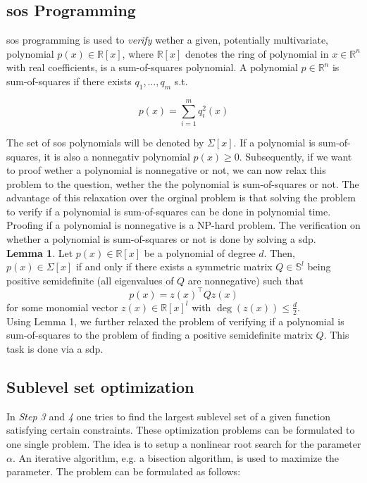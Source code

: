 \documentclass[10pt,a4paper]{article}
\begin{document}
\subsection{\gls{sos} Programming \cite{cunis_loureiro2023}}
\gls{sos} programming is used to \textit{verify} wether a given, potentially multivariate, polynomial $p(x) \in \mathbb{R}[x]$, where $\mathbb{R}[x]$ denotes
the ring of polynomial in $x \in \mathbb{R}^n$ with real coefficients, is a sum-of-squares polynomial. A polynomial $p \in \mathbb{R}^n$ is sum-of-squares if
there exists $q_1, \dots, q_m$ s.t.

\begin{equation}
	p(x)=\sum_{i=1}^m q_i^2(x)
\end{equation}

The set of \gls{sos} polynomials will be denoted by $\Sigma[x]$. If a polynomial is sum-of-squares, it is also a nonnegativ polynomial $p(x) \geq 0$.
Subsequently, if we want to proof wether a polynomial is nonnegative or not, we can now relax this problem to the question, wether the the polynomial
is sum-of-squares or not. The advantage of this relaxation over the orginal problem is that solving the problem to verify if a polynomial is 
sum-of-squares can be done in polynomial time. Proofing if a polynomial is nonnegative is a NP-hard problem. The verification on whether a polynomial
is sum-of-squares or not is done by solving a \gls{sdp}.\\

\textbf{Lemma 1}. Let $p(x) \in \mathbb{R}[x]$ be a polynomial of degree $d$. Then, $p(x) \in \Sigma[x]$ if and only if there exists a symmetric
matrix $Q \in \mathbb{S}^l$ being positive semidefinite (all eigenvalues of $Q$ are nonnegative) such that
\begin{equation}
	p(x)=z(x)^{\top} Q z(x)
\end{equation}
for some monomial vector $z(x) \in \mathbb{R}[x]^l$ with $\operatorname{deg}(z(x)) \leq \frac{d}{2}$.\\

Using Lemma 1, we further relaxed the problem of verifying if a polynomial is sum-of-squares to the problem of finding a positive semidefinite matrix $Q$.
This task is done via a \gls{sdp}.



\subsection{Sublevel set optimization}
In \textit{Step 3} and \textit{4} one tries to find the largest sublevel set of a given function satisfying certain constraints. These optimization problems
can be formulated to one single problem. The idea is to setup a nonlinear root search for the parameter $\alpha$. An iterative 
algorithm, e.g. a bisection algorithm, is used to maximize the parameter. The problem can be formulated as follows:
\end{document}

